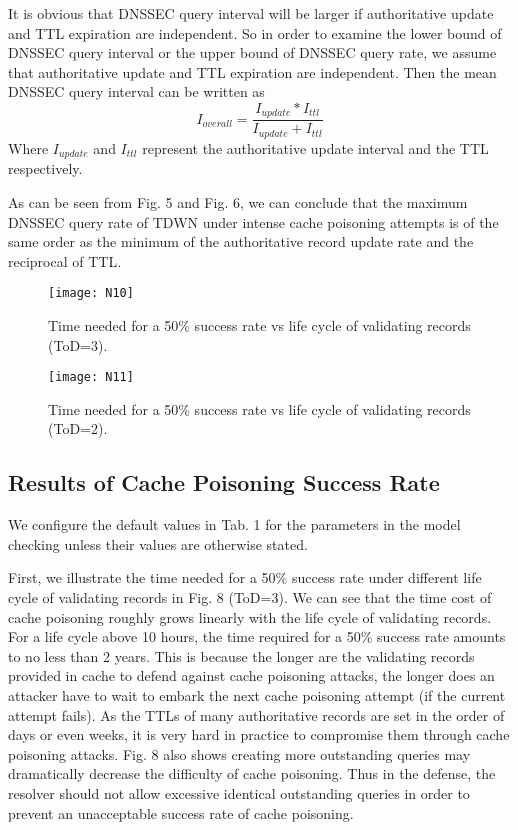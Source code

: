 \documentclass[conference]{IEEEtran}
\begin{document}
It is obvious that DNSSEC query interval will be larger if authoritative update and TTL expiration are independent. So in order to examine the lower bound of DNSSEC query interval or the upper bound of DNSSEC query rate, we assume that authoritative update and TTL expiration are independent. Then the mean DNSSEC query interval can be written as
\begin{equation}
I_{overall}=\frac{I_{update}*I_{ttl}}{I_{update}+I_{ttl}}
\end{equation}
Where $I_{update}$  and $I_{ttl}$  represent the authoritative update interval and the TTL respectively.


As can be seen from Fig. 5 and Fig. 6, we can conclude that the maximum DNSSEC query rate of TDWN under intense cache poisoning attempts is of the same order as the minimum of the authoritative record update rate and the reciprocal of TTL.

\begin{figure}[!t]\begin{minipage}[t]{0.48\linewidth}
\centering
\texttt{[image: N10]}
\vspace{-1em}
\caption{Time needed for a 50\% success rate vs life cycle of validating records (ToD=3).}
\vspace{-2em}
\end{minipage}
\hspace{0.3cm}
\begin{minipage}[t]{0.48\linewidth}
\centering
\texttt{[image: N11]}
\caption{Time needed for a 50\% success rate vs life cycle of validating records (ToD=2).}
\vspace{-2em}
\end{minipage}
\end{figure}

\subsection{Results of Cache Poisoning Success Rate}

We configure the default values in Tab. 1 for the parameters in the model checking unless their values are otherwise stated.


First, we illustrate the time needed for a 50\% success rate under different life cycle of validating records in Fig. 8 (ToD=3).  We can see that the time cost of cache poisoning roughly grows linearly with the life cycle of validating records. For a life cycle above 10 hours, the time required for a 50\% success rate amounts to no less than 2 years. This is because the longer are the validating records  provided in cache to defend against cache poisoning attacks, the longer does an attacker have to wait to embark the next cache poisoning attempt (if the current attempt fails). As the TTLs of many authoritative records are set in the order of days or even weeks, it is very hard in practice to compromise them through cache poisoning attacks. Fig. 8 also shows creating more outstanding queries may dramatically decrease the difficulty of cache poisoning. Thus in the defense, the resolver should not allow excessive identical outstanding queries in order to prevent an unacceptable success rate of cache poisoning.
\end{document}
